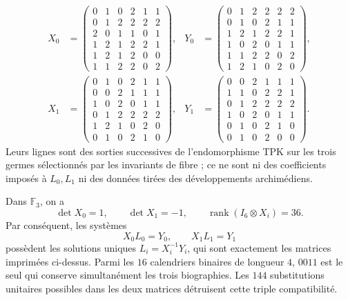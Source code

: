 \begin{equation}
\begin{aligned}
X_0&=\begin{pmatrix}
0&1&0&2&1&1\\0&1&2&2&2&2\\2&0&1&1&0&1\\
1&2&1&2&2&1\\1&2&1&2&0&0\\1&1&2&2&0&2
\end{pmatrix},&
Y_0&=\begin{pmatrix}
0&1&2&2&2&2\\0&1&0&2&1&1\\1&2&1&2&2&1\\
1&0&2&0&1&1\\1&1&2&2&0&2\\1&2&1&0&2&0
\end{pmatrix},\\[1ex]
X_1&=\begin{pmatrix}
0&1&0&2&1&1\\0&0&2&1&1&1\\1&0&2&0&1&1\\
0&1&2&2&2&2\\1&2&1&0&2&0\\0&1&0&2&1&0
\end{pmatrix},&
Y_1&=\begin{pmatrix}
0&0&2&1&1&1\\1&1&0&2&2&1\\0&1&2&2&2&2\\
1&0&2&0&1&1\\0&1&0&2&1&0\\0&1&0&2&0&0
\end{pmatrix}.
\end{aligned}
\label{eq:registro-transiciones-tpk-explicito-rev10}
\end{equation}
\endgroup
Leurs lignes sont des sorties successives de l'endomorphisme TPK sur les trois germes
sélectionnés par les invariants de fibre ; ce ne sont ni des coefficients imposés à
\(L_0,L_1\) ni des données tirées des développements archimédiens.

\begin{theorem}
\label{thm:reconstruccion-lifts-calendario-rev10}
Dans \(\mathbb F_3\), on a
\[
 \det X_0=1,
 \qquad \det X_1=-1,
 \qquad \operatorname{rank}(I_6\otimes X_i)=36.
\]
Par conséquent, les systèmes
\[
 X_0L_0=Y_0,
 \qquad X_1L_1=Y_1
\]
possèdent les solutions uniques \(L_i=X_i^{-1}Y_i\), qui sont exactement les
matrices imprimées ci-dessus. Parmi les \(16\) calendriers binaires de longueur
\(4\), \(0011\) est le seul qui conserve simultanément les trois
biographies. Les \(144\) substitutions unitaires possibles dans les deux matrices
détruisent cette triple compatibilité.
\end{theorem}

